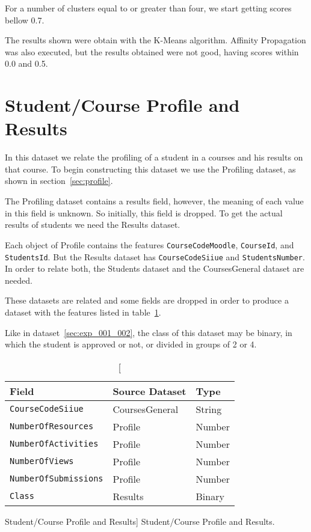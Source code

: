 For a number of clusters equal to or greater than four, we start getting scores
bellow 0.7.

The results shown were obtain with the K-Means algorithm. Affinity Propagation
was also executed, but the results obtained were not good, having scores within
0.0 and 0.5.

\section{Student/Course Profile and Results}
\label{sec:exp_005_006}

In this dataset we relate the profiling of a student in a courses and his
results on that course. To begin constructing this dataset we use the Profiling
dataset, as shown in section~\ref{sec:profile}.

The Profiling dataset contains a results field, however, the meaning of each
value in this field is unknown. So initially, this field is dropped. To get the
actual results of students we need the Results dataset.

Each object of Profile contains the features \texttt{CourseCodeMoodle},
\texttt{CourseId}, and \texttt{StudentsId}. But the Results dataset has
\texttt{CourseCodeSiiue} and \texttt{StudentsNumber}. In order to relate both,
the Students dataset and the CoursesGeneral dataset are needed.

These datasets are related and some fields are dropped in order to produce a
dataset with the features listed in table~\ref{tab:dat_003}.

Like in dataset~\ref{sec:exp_001_002}, the class of this dataset may be binary, in
which the student is approved or not, or divided in groups of 2 or 4.

\begin{table}[h!]
    \centering

    \begin{tabular}{| l | l | l |}
        \hline
        \textbf{Field}               & \textbf{Source Dataset} & \textbf{Type} \\ \hline
        \texttt{CourseCodeSiiue}     & CoursesGeneral          & String        \\ \hline
        \texttt{NumberOfResources}   & Profile                 & Number        \\ \hline
        \texttt{NumberOfActivities}  & Profile                 & Number        \\ \hline
        \texttt{NumberOfViews}       & Profile                 & Number        \\ \hline
        \texttt{NumberOfSubmissions} & Profile                 & Number        \\ \hline
        \texttt{Class}               & Results                 & Binary        \\ \hline
    \end{tabular}

    \caption
        [Student/Course Profile and Results]
        {Student/Course Profile and Results.}

    \label{tab:dat_003}
\end{table}

